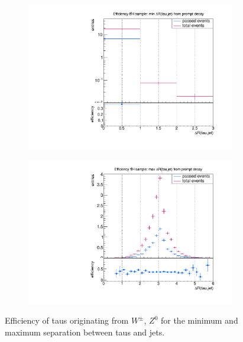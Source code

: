 %
%
\begin{figure}
  \centering
                \begin{subfigure}[t]{0.49\textwidth}
                \includegraphics[width=\textwidth]{figures/plots/ttH/Divided_pr_mindR_taujet.pdf}
                \label{dR:prompt:taujets:min}
                \end{subfigure}
                \begin{subfigure}[t]{0.49\textwidth}
                \includegraphics[width=\textwidth]{figures/plots/ttH/Divided_maxdR_pr_taujet.pdf}
                \label{dR:prompt:taujets:max}
                \end{subfigure}
\caption[Efficiency of taus originating from $W^\pm$, $Z^0$ for the separation between taus and jets.]{Efficiency of taus originating from $W^\pm$, $Z^0$ for the minimum and maximum separation between taus and jets.}
\label{dR:prompt:taujets}
\end{figure}
